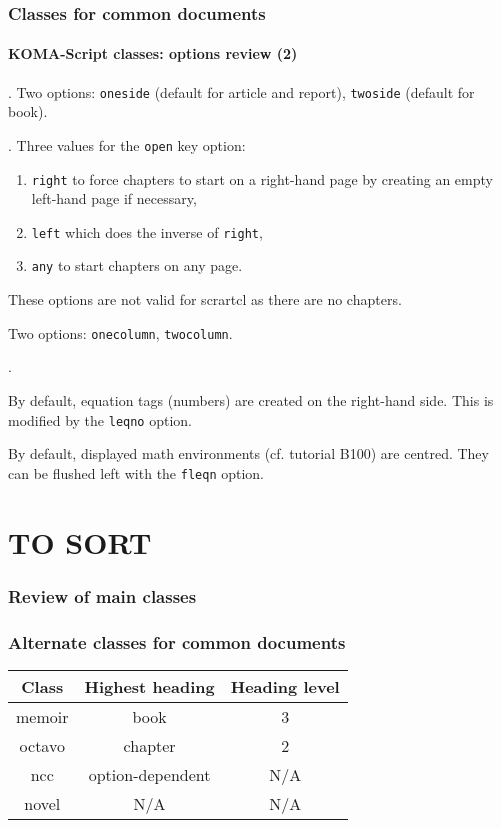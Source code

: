 \documentclass[11pt]{beamer}
\begin{document}
\begin{frame}
	\frametitle{Classes for common documents}
	\framesubtitle{KOMA-Script classes: options review (2)}
	
	
	.
	Two options: \texttt{oneside} (default for article and report), \texttt{twoside} (default for book).
	
	
	.
	Three values for the \texttt{open} key option:
	\begin{enumerate}
		\item \texttt{right} to force chapters to start on a right-hand page by creating an empty left-hand page if necessary,
		\item \texttt{left} which does the inverse of \texttt{right},
		\item \texttt{any} to start chapters on any page.
	\end{enumerate}
	These options are not valid for scrartcl as there are no chapters.
	
	
	\vspace*{1ex}
	
	
	Two options: \texttt{onecolumn}, \texttt{twocolumn}.
	
	
	\vspace*{1ex}
	
	
	.
	
	By default, equation tags (numbers) are created on the right-hand side.
	This is modified by the \texttt{leqno} option.
	
	By default, displayed math environments (cf. tutorial B100) are centred.
	They can be flushed left with the \texttt{fleqn} option.
\end{frame}



\section{TO SORT}

\begin{frame}
	\frametitle{Review of main classes}
	\frametitle{Alternate classes for common documents}
	
	
	\begin{table}[h]
		\begin{tabular}{*{3}{c}}
			\toprule
			 Class   & Highest heading  & Heading level \\ \midrule
			 memoir  &       book       &       3       \\
			 octavo  &     chapter      &       2       \\
			  ncc    & option-dependent &      N/A      \\
			 novel   &       N/A        &      N/A      \\ \bottomrule
		\end{tabular}
	\end{table}
\end{frame}
\end{document}
